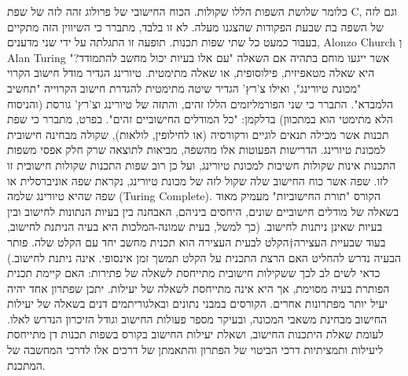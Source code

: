       כלומר שלושת השפות הללו שקולות. הכוח החישובי של פרולוג זהה לזה של שפת C,
      וגם לזה של השפה בת שבעת הפקודות שהצגנו מעלה. לא זו בלבד, מתברר כי השיווין
      הזה מתקיים בעבור כמעט כל שתי שפות תכנות. תופעה זו התגלתה על ידי שני
      מדענים, Alonzo Church וְ Alan Turing אשר ייגעו מוחם בתהיה אם השאלה "עם אלו
      בעיות יכול מחשב להתמודד?" היא שאלה מטאפיזית, פילוסופית, או שאלה מתימטית.
      טיורינג הגדיר מודל חישוב הקרוי "מכונת טיורינג", ואילו צ'רץ' הגדיר שיטה מתימטית להגדרת חישוב הקרוייה "תחשיב הלמבדא". התברר כי שני הפורמליזמים הללו זהים, והתזה של טיורינג וצ'רץ' גורסת (והניסוח הלא מתימטי הוא במתכוון) בדלקמן: "כל המודלים החישוביים זהים".
      בפרט, מתברר כי שפת תכנות אשר מכילה תנאים לוגיים ורקורסיה (או לחילופין, לולאות), שקולה מבחינה חישובית למכונת טיורינג. הדרישות הפעוטות אלו מהשפה, מביאות לתוצאה שרק חלק אפסי משפות התכנות אינות שקולות חשיבות למכונת טיורינג, ועל כן רוב שפות התכנות שקולות חישובית זו לזו.
      שפה אשר כוח החישוב שלה שקול לזה של מכונת טיורינג, נקראת שפה אוניברסלית או שפה שהיא טיורינג שלמה (Turing Complete).
      הקורס "תורת החישוביות" מעמיק מאוד בשאלה של מודלים חישוביים שונים, היחסים ביניהם, האבחנה בין בעיות הנתונות לחישוב ובין בעיות שאינן ניתנות לחישוב. (כך למשל, בעית שמונה-המלכות היא בעיה הניתנת לחישוב, בעוד שבעיית העצירה†{הקלט לבעית העצירה הוא תכנית מחשב יחד עם הקלט שלה. פותר הבעיה נדרש להחליט האם הרצת התכנית על הקלט תמשך זמן אינסופי.} אינה ניתנת לחישוב.)
      כדאי לשים לב לכך ששקילות חישובית מתייחסת לשאלה של פתירות: האם קיימת תכנית הפותרת בעיה מסוימת, אך היא אינה מתייחסת לשאלה של יעילות. יתכן שפתרון אחד יהיה יעיל יותר מפתרונות אחרים.
      הקורסים במבני נתונים ובאלגוריתמים דנים בשאלה של יעילות החישוב מבחינת משאבי המכונה, ובעיקר מספר פעולות החישוב וגודל הזיכרון הנדרש לאלו. לעומת שאלת היתכנות החישוב, ושאלת יעילות החישוב בקורס בשפות תכנות דן מתייחסת ליעילות ותמציתיות דרכי הביטוי של הפתרון והתאמתן של דרכים אלו לדרכי המחשבה של המתכנת.

